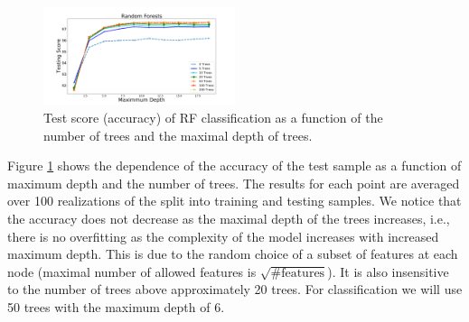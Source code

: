 \begin{figure}[h]
\hspace*{-0.5cm}
\includegraphics[width=0.5\textwidth]{plots/rf_train_assocnewfeats}
\caption{
Test score (accuracy) of RF classification as a function of the number of trees and 
the maximal depth of trees.
}
\label{fig:RF_complexity}
\end{figure}

Figure \ref{fig:RF_complexity} shows the dependence of the accuracy of the test sample as a function of maximum depth and the number of trees. 
The results for each point are averaged over 100 realizations of the split into training and testing samples.
We notice that the accuracy does not decrease as the maximal depth of the trees increases, i.e., there is no overfitting as the complexity of the model increases with increased maximum depth.
This is due to the random choice of a subset of features at each node (maximal number of allowed features is $\sqrt{\text{\# features}}$).
It is also insensitive to the number of trees above approximately 20 trees.
For classification we will use 50 trees with the maximum depth of 6.

